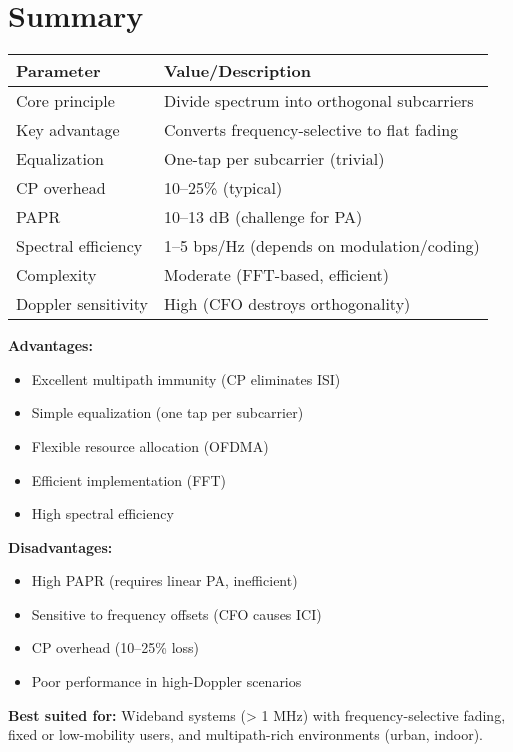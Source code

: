 \section{Summary}

\begin{center}
\begin{tabular}{@{}ll@{}}
\toprule
\textbf{Parameter} & \textbf{Value/Description} \\
\midrule
Core principle & Divide spectrum into orthogonal subcarriers \\
Key advantage & Converts frequency-selective to flat fading \\
Equalization & One-tap per subcarrier (trivial) \\
CP overhead & 10--25\% (typical) \\
PAPR & 10--13 dB (challenge for PA) \\
Spectral efficiency & 1--5 bps/Hz (depends on modulation/coding) \\
Complexity & Moderate (FFT-based, efficient) \\
Doppler sensitivity & High (CFO destroys orthogonality) \\
\bottomrule
\end{tabular}
\end{center}

\textbf{Advantages:}
\begin{itemize}
\item[\checkmark] Excellent multipath immunity (CP eliminates ISI)
\item[\checkmark] Simple equalization (one tap per subcarrier)
\item[\checkmark] Flexible resource allocation (OFDMA)
\item[\checkmark] Efficient implementation (FFT)
\item[\checkmark] High spectral efficiency
\end{itemize}

\textbf{Disadvantages:}
\begin{itemize}
\item[\texttimes] High PAPR (requires linear PA, inefficient)
\item[\texttimes] Sensitive to frequency offsets (CFO causes ICI)
\item[\texttimes] CP overhead (10--25\% loss)
\item[\texttimes] Poor performance in high-Doppler scenarios
\end{itemize}

\textbf{Best suited for:} Wideband systems (> 1 MHz) with frequency-selective fading, fixed or low-mobility users, and multipath-rich environments (urban, indoor).

